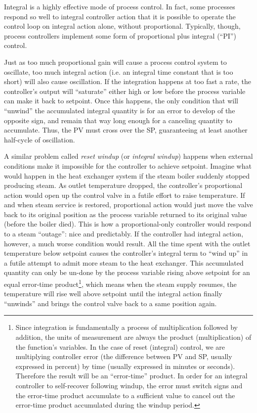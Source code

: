 \vskip 10pt

Integral is a highly effective mode of process control.  In fact, some processes respond so well to integral controller action that it is possible to operate the control loop on integral action alone, without proportional.  Typically, though, process controllers implement some form of proportional plus integral (``PI'') control.
 
Just as too much proportional gain will cause a process control system to oscillate, too much integral action (i.e. an integral time constant that is too short) will also cause oscillation.  If the integration happens at too fast a rate, the controller's output will ``saturate'' either high or low before the process variable can make it back to setpoint.  Once this happens, the only condition that will ``unwind'' the accumulated integral quantity is for an error to develop of the opposite sign, and remain that way long enough for a canceling quantity to accumulate.  Thus, the PV must cross over the SP, guaranteeing at least another half-cycle of oscillation.

\vskip 10pt

A similar problem called \textit{reset windup} (or \textit{integral windup}) happens when external conditions make it impossible for the controller to achieve setpoint.  Imagine what would happen in the heat exchanger system if the steam boiler suddenly stopped producing steam.  As outlet temperature dropped, the controller's proportional action would open up the control valve in a futile effort to raise temperature.  If and when steam service is restored, proportional action would just move the valve back to its original position as the process variable returned to its original value (before the boiler died).  This is how a proportional-only controller would respond to a steam ``outage'': nice and predictably.  If the controller had integral action, however, a much worse condition would result.  All the time spent with the outlet temperature below setpoint causes the controller's integral term to ``wind up'' in a futile attempt to admit more steam to the heat exchanger.  This accumulated quantity can only be un-done by the process variable rising above setpoint for an equal error-time product\footnote{Since integration is fundamentally a process of multiplication followed by addition, the units of measurement are always the product (multiplication) of the function's variables.  In the case of reset (integral) control, we are multiplying controller error (the difference between PV and SP, usually expressed in percent) by time (usually expressed in minutes or seconds).  Therefore the result will be an ``error-time'' product.  In order for an integral controller to self-recover following windup, the error must switch signs and the error-time product accumulate to a sufficient value to cancel out the error-time product accumulated during the windup period.}, which means when the steam supply resumes, the temperature will rise well above setpoint until the integral action finally ``unwinds'' and brings the control valve back to a same position again.    

